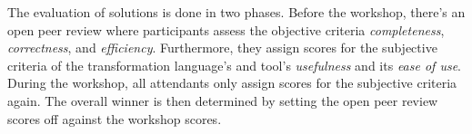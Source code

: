 \documentclass[submission]{eptcs}
\begin{document}
The evaluation of solutions is done in two phases.  Before the workshop,
there's an open peer review where participants assess the objective criteria
\emph{completeness}, \emph{correctness}, and \emph{efficiency}.  Furthermore,
they assign scores for the subjective criteria of the transformation language's
and tool's \emph{usefulness} and its \emph{ease of use}.  During the workshop,
all attendants only assign scores for the subjective criteria again.  The
overall winner is then determined by setting the open peer review scores off
against the workshop scores.



\end{document}
